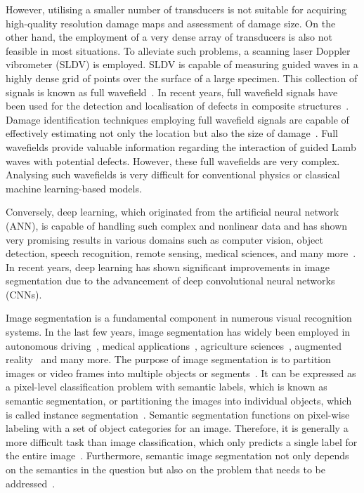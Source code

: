 However, utilising a smaller number of transducers is not suitable for acquiring high-quality resolution damage maps and assessment of damage size.
On the other hand, the employment of a very dense array of transducers is also not feasible in most situations. 
To alleviate such problems, a scanning laser Doppler vibrometer (SLDV) is employed.
SLDV is capable of measuring guided waves in a highly dense grid of points over the surface of a large specimen.
This collection of signals is known as full wavefield~\cite{Radzienski2019a}. 
In recent years, full wavefield signals have been used for the detection and localisation of defects in composite
structures~\cite{Radzienski2019a, Girolamo2018a, kudela2018impact,  rogge2013characterization}.
Damage identification techniques employing full wavefield signals are capable of effectively estimating not only the location but also the size of damage~\cite{Girolamo2018a, kudela2018impact}.
Full wavefields provide valuable information regarding the interaction of guided Lamb waves with potential defects.
However, these full wavefields are very complex.
Analysing such wavefields is very difficult for conventional physics or classical machine learning-based models.

Conversely, deep learning, which originated from the artificial neural network (ANN), is capable of handling such complex and nonlinear data and has shown very promising results in various domains such as computer vision, object detection, speech recognition, remote sensing, medical sciences, and many more~\cite{mohanty2016using, zhang2020well, pashaei2020review}.
In recent years, deep learning has shown significant improvements in image segmentation due to the advancement of deep convolutional neural networks (CNNs).

Image segmentation is a fundamental component in numerous visual recognition
systems. In the last few years, image segmentation has widely been
employed in autonomous driving~\cite{ros2016synthia, li2018real}, medical applications~\cite{taghanaki2021deep}, agriculture sciences~\cite{milioto2018real}, augmented reality~\cite{miksik2015semantic} and many more. 
The purpose of image segmentation is to partition images or video frames into multiple objects or segments~\cite{szeliski2010computer}.
It can be expressed as a pixel-level classification problem with semantic labels, which is known as semantic segmentation, or partitioning the images into individual objects, which is called instance segmentation~\cite{szeliski2010computer, minaee2021image}. 
Semantic segmentation functions on pixel-wise labeling with a set of object categories for an image. 
Therefore, it is generally a more difficult task than image classification, which only predicts a single label for the entire image~\cite{minaee2021image}.
Furthermore, semantic image segmentation not only depends on the semantics in the question but also on the problem that needs to be addressed~\cite{ghosh2019understanding}.

